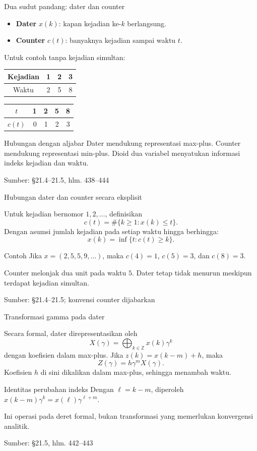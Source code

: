 \documentclass[aspectratio=169,11pt]{beamer}
\newcommand{\source}[1]{%
    \vfill
    \hfill{\tiny\color{gray}Sumber: #1}
}
\begin{document}
\begin{frame}{Dua sudut pandang: dater dan counter}


\begin{itemize}
\item \textbf{Dater} $x(k)$: kapan kejadian ke-$k$ berlangsung.
\item \textbf{Counter} $c(t)$: banyaknya kejadian sampai waktu $t$.
\end{itemize}
Untuk contoh tanpa kejadian simultan:
\begin{center}\begin{tabular}{c|ccc}
Kejadian&1&2&3\\\midrule
Waktu&2&5&8
\end{tabular}\qquad
\begin{tabular}{c|rrrr}
$t$&1&2&5&8\\\midrule
$c(t)$&0&1&2&3
\end{tabular}\end{center}
\begin{block}{Hubungan dengan aljabar}
Dater mendukung representasi max-plus. Counter mendukung representasi min-plus.
Dioid dua variabel menyatukan informasi indeks kejadian dan waktu.
\end{block}

\source{\S21.4--21.5, hlm. 438--444}

\end{frame}
\begin{frame}{Hubungan dater dan counter secara eksplisit}

Untuk kejadian bernomor $1,2,\ldots$, definisikan
\[
c(t)=\#\{k\ge1:x(k)\le t\}.
\]
Dengan asumsi jumlah kejadian pada setiap waktu hingga berhingga:
\[
x(k)=\inf\{t:c(t)\ge k\}.
\]
\begin{exampleblock}{Contoh}
Jika $x=(2,5,5,9,\ldots)$, maka $c(4)=1$, $c(5)=3$, dan $c(8)=3$.
\end{exampleblock}
Counter melonjak dua unit pada waktu $5$.
Dater tetap tidak menurun meskipun terdapat kejadian simultan.

\source{\S21.4--21.5; konvensi counter dijabarkan}
\end{frame}
\begin{frame}{Transformasi gamma pada dater}

Secara formal, dater direpresentasikan oleh
\[
X(\gamma)=\bigoplus_{k\in\mathbb Z}x(k)\gamma^k
\]
dengan koefisien dalam max-plus.
Jika $z(k)=x(k-m)+h$, maka
\[
Z(\gamma)=h\gamma^m X(\gamma).
\]
Koefisien $h$ di sini dikalikan dalam max-plus, sehingga menambah waktu.
\begin{block}{Identitas perubahan indeks}
Dengan $\ell=k-m$, diperoleh
$x(k-m)\gamma^k=x(\ell)\gamma^{\ell+m}$.
\end{block}
Ini operasi pada deret formal, bukan transformasi yang memerlukan konvergensi analitik.

\source{\S21.5, hlm. 442--443}
\end{frame}
\end{document}
